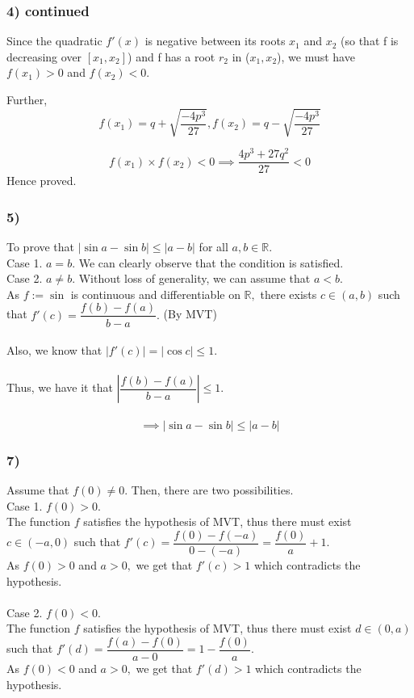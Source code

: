 \documentclass[handout]{beamer}
\begin{document}
\begin{frame}
    \frametitle{4) continued}
    Since the quadratic $f'(x)$ is negative between its roots $x_{1}$ and $x_{2}$ (so that f is decreasing over $[x_{1} , x_{2}]$) and
    f has a root $r_{2}$ in ($x_{1} , x_{2} $), we must have $f(x_{1} ) > 0$ and $f (x_{2} ) < 0$. 
    
    Further, 
    \[f(x_{1}) = q+ \sqrt{\frac{-4p^{3}}{27}},f(x_{2}) = q- \sqrt{\frac{-4p^{3}}{27}}\]

    \[f(x_{1})\times f(x_{2})< 0 \implies \frac{4p^{3}+27q^{2}}{27} < 0\]
    Hence proved.
    \end{frame}

\begin{frame}
\frametitle{5)}
To prove that $|\sin a - \sin b| \le |a - b|$ for all $a, b \in \mathbb{R}.$\\
Case 1. $a = b.$ We can clearly observe that the condition is satisfied.\\
Case 2. $a \neq b.$ Without loss of generality, we can assume that $a < b.$\\
As $f := \sin$ is continuous and differentiable on $\mathbb{R},$ there exists $c \in (a, b)$ such that $f'(c) = \dfrac{f(b) - f(a)}{b - a}.$ \hfill (By MVT)\\~\\
Also, we know that $|f'(c)| = |\cos c| \le 1.$\\~\\
Thus, we have it that $\left|\dfrac{f(b) - f(a)}{b - a}\right| \le 1.$\\~\\
\[\implies |\sin a - \sin b| \le |a - b| \]
\end{frame}

\begin{frame}
\frametitle{7)}
Assume that $f(0) \neq 0.$ Then, there are two possibilities.\\
	Case 1. $f(0) > 0.$\\
	The function $f$ satisfies the hypothesis of MVT, thus there must exist $c \in (-a, 0)$ such that $f'(c) = \dfrac{f(0) - f(-a)}{0 - (-a)} = \dfrac{f(0)}{a} + 1.$\\
	As $f(0) > 0$ and $a > 0,$ we get that $f'(c) > 1$ which contradicts the hypothesis.\\~\\
	Case 2. $f(0) < 0.$\\
	The function $f$ satisfies the hypothesis of MVT, thus there must exist $d \in (0, a)$ such that $f'(d) = \dfrac{f(a) - f(0)}{a - 0} =1 - \dfrac{f(0)}{a}.$\\
	As $f(0) < 0$ and $a > 0,$ we get that $f'(d) > 1$ which contradicts the hypothesis.\\~\\
\end{frame}
\end{document}
